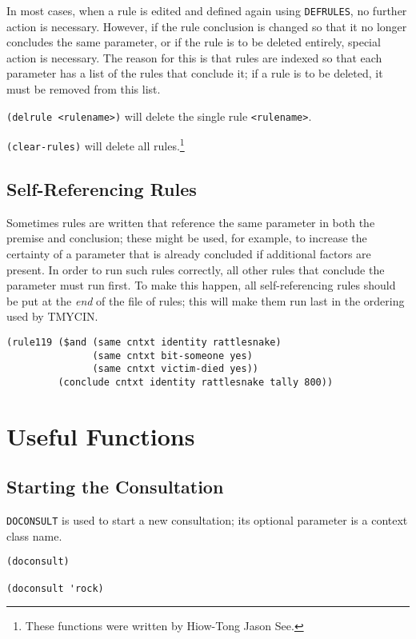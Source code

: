 In most cases, when a rule is edited and defined again using {\tt DEFRULES},
no further action is necessary.  However, if the rule conclusion is changed
so that it no longer concludes the same parameter, or if the rule is to be
deleted entirely, special action is necessary.  The reason for this is that
rules are indexed so that each parameter has a list of the rules that conclude
it; if a rule is to be deleted, it must be removed from this list.

{\tt (delrule\ <rulename>)} will delete the single rule {\tt <rulename>}.

{\tt (clear-rules)} will delete all rules.\footnote{These functions were
written by Hiow-Tong Jason See.}

\subsection{Self-Referencing Rules}

Sometimes rules are written that reference the same parameter in both the
premise and conclusion; these might be used, for example, to increase the
certainty of a parameter that is already concluded if additional factors
are present.  In order to run such rules correctly, all other rules
that conclude the parameter must run first.  To make this happen, all
self-referencing rules should be put at the {\em end} of the file of rules;
this will make them run last in the ordering used by TMYCIN.

\begin{verbatim}
(rule119 ($and (same cntxt identity rattlesnake)
               (same cntxt bit-someone yes)
               (same cntxt victim-died yes))
         (conclude cntxt identity rattlesnake tally 800))
\end{verbatim}

\section{Useful Functions}

\subsection{Starting the Consultation}

{\tt DOCONSULT} is used to start a new consultation; its optional
parameter is a context class name.

\begin{verbatim}
(doconsult)

(doconsult 'rock)
\end{verbatim}

